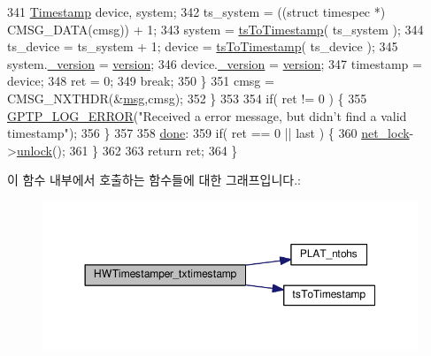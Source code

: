 \begin{DoxyCode}
341             \hyperlink{class_timestamp}{Timestamp} device, system;
342             ts\_system = ((\textcolor{keyword}{struct }timespec *) CMSG\_DATA(cmsg)) + 1;
343             system = \hyperlink{linux__hal__common_8cpp_aca59dd57dc39771609459e65457e0740}{tsToTimestamp}( ts\_system );
344             ts\_device = ts\_system + 1; device = \hyperlink{linux__hal__common_8cpp_aca59dd57dc39771609459e65457e0740}{tsToTimestamp}( ts\_device );
345             system.\hyperlink{class_timestamp_a8fab72cfd922b5757580642c2309e9bd}{\_version} = \hyperlink{class_common_timestamper_ab22abc2906422da61885ac6c8e6a1a59}{version};
346             device.\hyperlink{class_timestamp_a8fab72cfd922b5757580642c2309e9bd}{\_version} = \hyperlink{class_common_timestamper_ab22abc2906422da61885ac6c8e6a1a59}{version};
347             timestamp = device;
348             ret = 0;
349             \textcolor{keywordflow}{break};
350         \}
351         cmsg = CMSG\_NXTHDR(&\hyperlink{maap__log__linux_8c_a0c7e58a50354c4a4d6dad428d0e47029}{msg},cmsg);
352     \}
353 
354     \textcolor{keywordflow}{if}( ret != 0 ) \{
355         \hyperlink{gptp__log_8hpp_afefbb1009717c128012bfeed94842987}{GPTP\_LOG\_ERROR}(\textcolor{stringliteral}{"Received a error message, but didn't find a valid timestamp"});
356     \}
357 
358  \hyperlink{mrp_validate_8c_a5992b274cfdcacdbc1fa8347fd01ebde}{done}:
359     \textcolor{keywordflow}{if}( ret == 0 || last ) \{
360         \hyperlink{class_linux_timestamper_generic_a9a02854f530a2e2f70741e2970ea1fd5}{net\_lock}->\hyperlink{class_ticketing_lock_ae399421ee39cae4df5ea44bd21e31254}{unlock}();
361     \}
362 
363     \textcolor{keywordflow}{return} ret;
364 \}
\end{DoxyCode}


이 함수 내부에서 호출하는 함수들에 대한 그래프입니다.\+:
\nopagebreak
\begin{figure}[H]
\begin{center}
\leavevmode
\includegraphics[width=350pt]{class_linux_timestamper_generic_a8ca092c3a907618eebf1d512de28db18_cgraph}
\end{center}
\end{figure}




